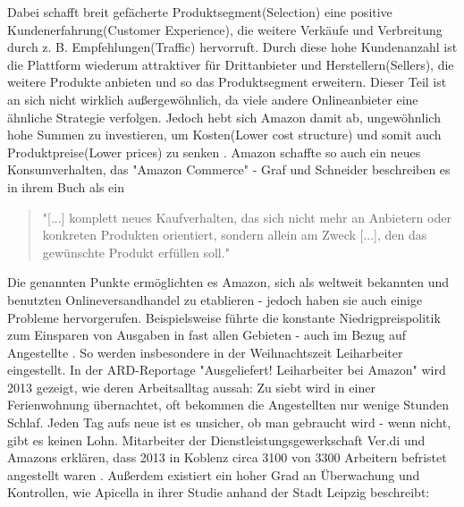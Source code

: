\documentclass[a4paper, 12pt]{scrartcl}
\begin{document}
\noindent Dabei schafft breit gefächerte Produktsegment(Selection) eine positive Kundenerfahrung(Customer Experience), die weitere Verkäufe und Verbreitung durch z. B. Empfehlungen(Traffic) hervorruft. Durch diese hohe Kundenanzahl ist die Plattform wiederum attraktiver für Drittanbieter und Herstellern(Sellers), die weitere Produkte anbieten und so das Produktsegment erweitern. Dieser Teil ist an sich nicht wirklich außergewöhnlich, da viele andere Onlineanbieter eine ähnliche Strategie verfolgen. Jedoch hebt sich Amazon damit ab, ungewöhnlich hohe Summen zu investieren, um Kosten(Lower cost structure) und somit auch Produktpreise(Lower prices) zu senken \cite[S. 26f]{Graf}. Amazon schaffte so auch ein neues Konsumverhalten, das "Amazon Commerce" - Graf und Schneider beschreiben es in ihrem Buch als ein

\begin{quote}
    "[...] komplett neues Kaufverhalten, das sich nicht mehr an Anbietern oder konkreten Produkten orientiert, sondern allein am Zweck [...], den das gewünschte Produkt erfüllen soll." \cite[S. 42]{Graf}
\end{quote}
Die genannten Punkte ermöglichten es Amazon, sich als weltweit bekannten und benutzten Onlineversandhandel zu etablieren - jedoch haben sie auch einige Probleme hervorgerufen. Beispielsweise führte die konstante Niedrigpreispolitik \cite[Abb. 5]{Desjardins} zum Einsparen von Ausgaben in fast allen Gebieten - auch im Bezug auf Angestellte \cite[S. 6]{Apicella}. So werden insbesondere in der Weihnachtszeit Leiharbeiter eingestellt. In der ARD-Reportage "Ausgeliefert! Leiharbeiter bei Amazon" wird 2013 gezeigt, wie deren Arbeitsalltag aussah: Zu siebt wird in einer Ferienwohnung übernachtet, oft bekommen die Angestellten nur wenige Stunden Schlaf. Jeden Tag aufs neue ist es unsicher, ob man gebraucht wird - wenn nicht, gibt es keinen Lohn. Mitarbeiter der Dienstleistungsgewerkschaft Ver.di und Amazons erklären, dass 2013 in Koblenz circa 3100 von 3300 Arbeitern befristet angestellt waren \cite{Ausgeliefert}.
Außerdem existiert ein hoher Grad an Überwachung und Kontrollen, wie Apicella in ihrer Studie anhand der Stadt Leipzig beschreibt:
\end{document}
